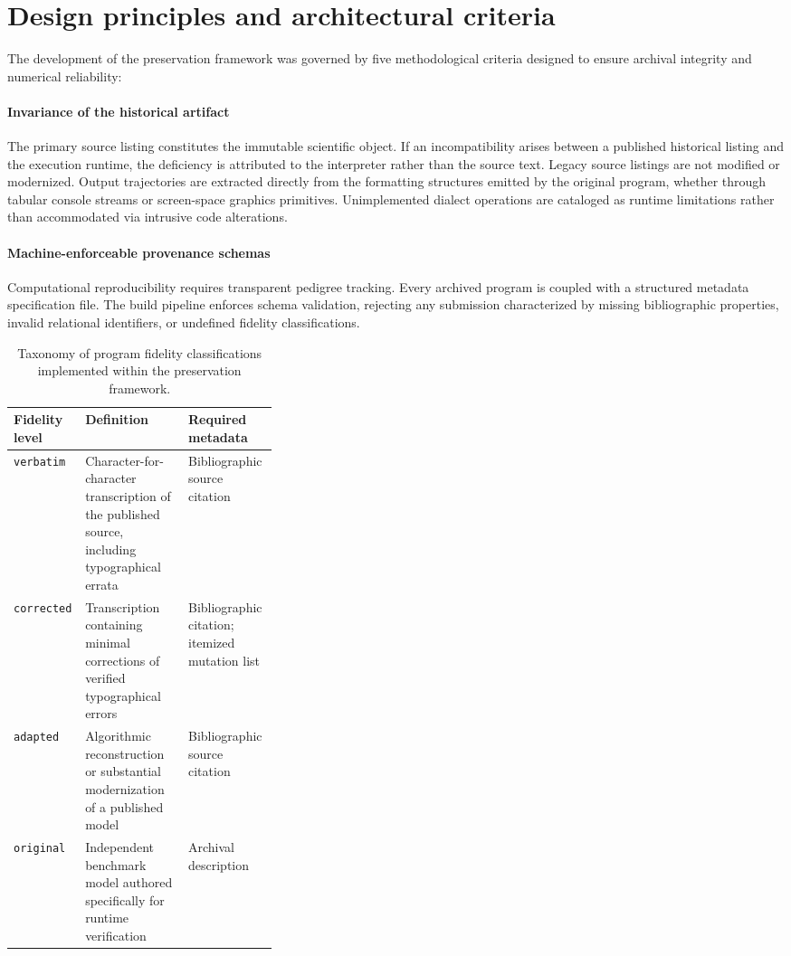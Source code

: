 \documentclass[3p,times,authoryear,twocolumn]{elsarticle}
\begin{document}
\section{Design principles and architectural criteria}
\label{sec:design}

The development of the preservation framework was governed by five methodological criteria designed to ensure archival integrity and numerical reliability:

\paragraph{Invariance of the historical artifact} The primary source listing constitutes the immutable scientific object. If an incompatibility arises between a published historical listing and the execution runtime, the deficiency is attributed to the interpreter rather than the source text. Legacy source listings are not modified or modernized. Output trajectories are extracted directly from the formatting structures emitted by the original program, whether through tabular console streams or screen-space graphics primitives. Unimplemented dialect operations are cataloged as runtime limitations rather than accommodated via intrusive code alterations.

\paragraph{Machine-enforceable provenance schemas} Computational reproducibility requires transparent pedigree tracking. Every archived program is coupled with a structured metadata specification file. The build pipeline enforces schema validation, rejecting any submission characterized by missing bibliographic properties, invalid relational identifiers, or undefined fidelity classifications. 

\begin{table}[t]
\centering\small
\begin{tabularx}{\linewidth}{@{}lXp{0.34\linewidth}@{}}
\toprule
Fidelity level & Definition & Required metadata \\
\midrule
\texttt{verbatim} & Character-for-character transcription of the published source, including typographical errata & Bibliographic source citation \\
\texttt{corrected} & Transcription containing minimal corrections of verified typographical errors & Bibliographic citation; itemized mutation list \\
\texttt{adapted} & Algorithmic reconstruction or substantial modernization of a published model & Bibliographic source citation \\
\texttt{original} & Independent benchmark model authored specifically for runtime verification & Archival description \\
\bottomrule
\end{tabularx}
\caption{Taxonomy of program fidelity classifications implemented within the preservation framework.}
\label{tab:fidelity}
\end{table}
\end{document}
